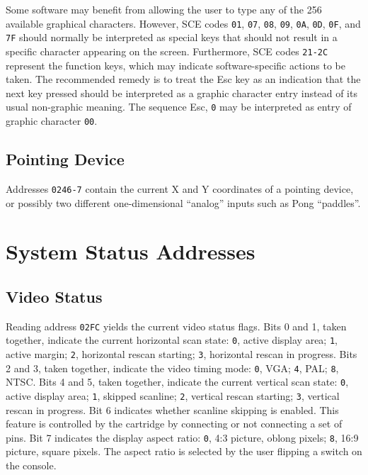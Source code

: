 \documentclass[12pt]{{memoir}}
\begin{document}
Some software may benefit from allowing the user to type any of the 256 available graphical characters. However, SCE codes \texttt{01}, \texttt{07}, \texttt{08}, \texttt{09}, \texttt{0A}, \texttt{0D}, \texttt{0F}, and \texttt{7F} should normally be interpreted as special keys that should not result in a specific character appearing on the screen. Furthermore, SCE codes \texttt{21-2C} represent the function keys, which may indicate software-specific actions to be taken. The recommended remedy is to treat the \textsf{Esc} key as an indication that the next key pressed should be interpreted as a graphic character entry instead of its usual non-graphic meaning. The sequence \textsf{Esc}, \texttt{0} may be interpreted as entry of graphic character \texttt{00}.

\subsection{Pointing Device}

Addresses \texttt{0246-7} contain the current X and Y coordinates of a pointing device, or possibly two different one-dimensional ``analog'' inputs such as Pong ``paddles''.

\section{System Status Addresses}
\label{sec:otherinput}

\subsection{Video Status}
\label{ss:videostatusbyte}

Reading address \texttt{02FC} yields the current video status flags. Bits 0 and 1, taken together, indicate the current horizontal scan state: \texttt{0}, active display area; \texttt{1}, active margin; \texttt{2}, horizontal rescan starting; \texttt{3}, horizontal rescan in progress. Bits 2 and 3, taken together, indicate the video timing mode: \texttt{0}, VGA; \texttt{4}, PAL; \texttt{8}, NTSC. Bits 4 and 5, taken together, indicate the current vertical scan state: \texttt{0}, active display area; \texttt{1}, skipped scanline; \texttt{2}, vertical rescan starting; \texttt{3}, vertical rescan in progress. Bit 6 indicates whether scanline skipping is enabled. This feature is controlled by the cartridge by connecting or not connecting a set of pins. Bit 7 indicates the display aspect ratio: \texttt{0}, 4:3 picture, oblong pixels; \texttt{8}, 16:9 picture, square pixels. The aspect ratio is selected by the user flipping a switch on the console.
\end{document}
